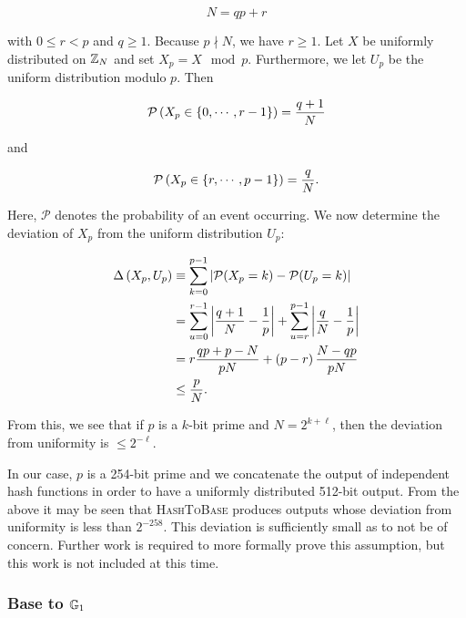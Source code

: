 \begin{equation}
    N = qp + r
\end{equation}

\noindent
with $0\le r< p$ and $q\ge1$.
Because $p\nmid N$, we have $r\ge1$.
Let $X$ be uniformly distributed on $\mathbb{Z}_{N}$ and set $X_{p} = X \mod p$.
Furthermore, we let $U_{p}$ be the uniform distribution modulo $p$.
Then

\begin{equation}
    \mathcal{P}\left( X_{p}\in\left\{ 0,\cdots,r-1 \right\} \right) = \frac{q+1}{N}
\end{equation}

\noindent
and

\begin{equation}
    \mathcal{P}\left( X_{p}\in\left\{ r,\cdots,p-1 \right\} \right) = \frac{q}{N}.
\end{equation}

\noindent
Here, $\mathcal{P}$ denotes the probability of an event occurring.
We now determine the deviation of $X_{p}$ from the uniform
distribution $U_{p}$:

\begin{align}
    \Delta\left( X_{p},U_{p} \right) &\equiv
        \sum_{k=0}^{p-1} \left| \mathcal{P}(X_{p}=k) - \mathcal{P}(U_{p}=k) \right|
        \nonumber\\
    &= \sum_{u=0}^{r-1} \left| \frac{q+1}{N} - \frac{1}{p} \right| +
        \sum_{u=r}^{p-1} \left| \frac{q}{N} - \frac{1}{p} \right| \nonumber\\
    &= r\frac{qp + p - N}{pN} + \left( p-r \right)\frac{N-qp}{pN}
        \nonumber\\
    &\le \frac{p}{N}.
\end{align}

\noindent
From this, we see that if $p$ is a $k$-bit prime and
$N = 2^{k+\ell}$, then the deviation from uniformity is $\le2^{-\ell}$.

In our case, $p$ is a 254-bit prime and we concatenate the output
of independent hash functions in order to have a uniformly distributed
512-bit output.
From the above it may be seen that \textsc{HashToBase} produces outputs whose
deviation from uniformity is less than $2^{-258}$.
This deviation is sufficiently small as to not be of concern.
Further work is required to more formally prove this assumption, but
this work is not included at this time.


\subsubsection{Base to $\mathbb{G}_{1}$}
\label{sssec:base-to-G1}

